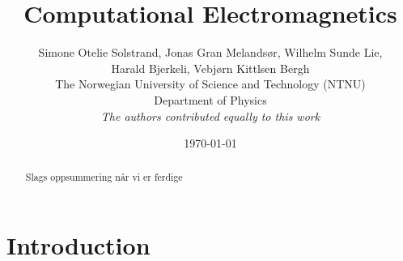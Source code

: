 \documentclass[11pt]{article}
\title{Computational Electromagnetics}
\author{Simone Otelie Solstrand, Jonas Gran Melandsør, Wilhelm Sunde Lie, \\ Harald Bjerkeli, Vebjørn Kittlsen Bergh
\\[1em]
\small{The Norwegian University of Science and Technology (NTNU)}
\\
\footnotesize{Department of Physics}
\\[1em]
\textit{\footnotesize{The authors contributed equally to this work}}
}
\date{\footnotesize\today}
\numberwithin{equation}{section}
\begin{document}
\maketitle


\begin{center}

\end{center}







\begin{abstract}
    Slags oppsummering når vi er ferdige
\end{abstract}

\section{Introduction}






\printbibliography
\end{document}
